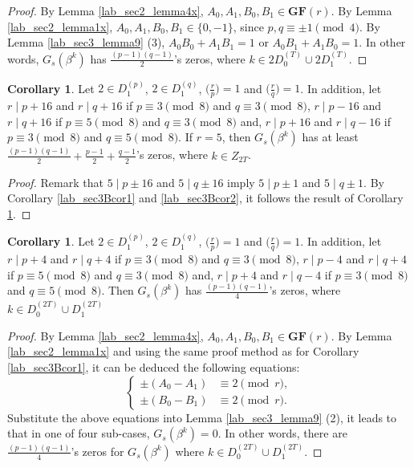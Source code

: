\documentclass{mcom-l}
\theoremstyle{definition}
\newtheorem{sec3Bcor3}[sec3Bcor1]{Corollary}
\newtheorem{sec3Bcor4}[sec3Bcor1]{Corollary}
\numberwithin{equation}{section}
\begin{document}
   \begin{proof}
   By Lemma \ref{lab_sec2_lemma4x}, $ A_{0},A_{1},B_{0},B_{1} \in \mathbf{GF}(r)$. By Lemma \ref{lab_sec2_lemma1x}, $ A_{0},A_{1},B_{0},B_{1} \in \lbrace 0,-1\rbrace$, since $ p,q\equiv\pm 1\pmod 4 $. By Lemma \ref{lab_sec3_lemma9} (3), $ A_{0}B_{0}+A_{1}B_{1}=1 $ or $ A_{0}B_{1}+A_{1}B_{0}=1 $. In other words,  $ G_{s}(\beta^{k}) $ has  $ \tfrac{(p-1)(q-1)}{2} $'s zeros, where $ k\in 2D_{0}^{(T)}\cup 2D_{1}^{(T)} $.
   \end{proof}
    \begin{sec3Bcor3}\label{lab_sec3Bcor3}
    Let $ 2\in D_{1}^{(p)} $, $ 2\in D_{1}^{(q)} $, $ \bigl(\tfrac{r}{p}\bigr) =1$ and $ \bigl(\tfrac{r}{q}\bigr) =1$. In addition, let $ r\mid p+16 $ and $ r\mid q+16 $ if $ p\equiv 3 \pmod 8 $ and $ q\equiv 3 \pmod 8 $, $ r\mid p-16 $ and $ r\mid q+16 $ if $ p\equiv 5 \pmod 8 $ and $ q\equiv 3 \pmod 8 $ and, $ r\mid p+16 $ and $ r\mid q-16 $ if $ p\equiv 3 \pmod 8 $ and $ q\equiv 5 \pmod 8 $. If $ r=5 $, then $ G_{s}(\beta^{k}) $ has at least $ \tfrac{(p-1)(q-1)}{2}+\tfrac{p-1}{2}+\tfrac{q-1}{2} $'s zeros, where $ k\in Z_{2T} $.
    \end{sec3Bcor3}
    \begin{proof}
    Remark that $ 5\mid p\pm 16 $ and $ 5\mid q\pm 16 $ imply $ 5\mid p\pm 1 $ and $ 5\mid q\pm 1 $. By Corollary \ref{lab_sec3Bcor1} and \ref{lab_sec3Bcor2}, it follows the result of Corollary \ref{lab_sec3Bcor3}.
    \end{proof}
    \begin{sec3Bcor4}\label{lab_sec3Bcor4}
      Let $ 2\in D_{1}^{(p)} $, $ 2\in D_{1}^{(q)} $, $ \bigl(\tfrac{r}{p}\bigr) =1$ and $ \bigl(\tfrac{r}{q}\bigr) =1$. In addition, let $ r\mid p+4 $ and $ r\mid q+4 $ if $ p\equiv 3 \pmod 8 $ and $ q\equiv 3 \pmod 8 $, $ r\mid p-4 $ and $ r\mid q+4 $ if $ p\equiv 5 \pmod 8 $ and $ q\equiv 3 \pmod 8 $ and, $ r\mid p+4 $ and $ r\mid q-4 $ if $ p\equiv 3 \pmod 8 $ and $ q\equiv 5 \pmod 8 $.  Then $ G_{s}(\beta^{k}) $ has  $ \tfrac{(p-1)(q-1)}{4} $'s zeros, where $ k\in D_{0}^{(2T)}\cup D_{1}^{(2T)} $
      \end{sec3Bcor4}
      \begin{proof}
      By Lemma \ref{lab_sec2_lemma4x}, $ A_{0},A_{1},B_{0},B_{1} \in \mathbf{GF}(r)$. By Lemma \ref{lab_sec2_lemma1x} and using the same proof method as for Corollary \ref{lab_sec3Bcor1}, it can be deduced the following equations:
      \begin{equation*}
      \begin{cases}
      \pm( A_{0}- A_{1}) &\equiv 2 \pmod r,\\
      \pm( B_{0}- B_{1}) &\equiv 2 \pmod r.
      \end{cases}
      \end{equation*} 
      Substitute the above equations into Lemma \ref{lab_sec3_lemma9} (2), it leads to that in one of four sub-cases, $ G_{s}(\beta^{k})=0 $. In other words, there are $ \tfrac{(p-1)(q-1)}{4} $'s zeros for $ G_{s}(\beta^{k})$ where $ k\in D_{0}^{(2T)}\cup D_{1}^{(2T)} $.
      \end{proof} 
\end{document}

